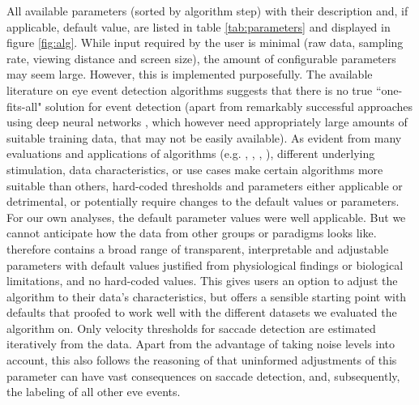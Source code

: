     All available parameters (sorted by algorithm step) with their description and, if applicable, default value, are
    listed in table \ref{tab:parameters} and displayed in figure \ref{fig:alg}. While input required by the user is
    minimal (raw data, sampling rate, viewing distance and screen size), the amount of configurable parameters may seem
    large. However, this is implemented purposefully.
    The available literature on eye event detection algorithms suggests that there is no true ``one-fits-all" solution
    for event detection (apart from remarkably successful approaches using deep neural networks \citep{Startsev2018},
    which however need appropriately large amounts of suitable training data, that may not be easily available). As
    evident from many evaluations and applications of algorithms (e.g. \cite{Andersson2017}, \cite{Larsson2013},
    \cite{Zemblys2018}, \cite{5523936}), different underlying stimulation, data characteristics, or use cases make
    certain algorithms more suitable than others, hard-coded thresholds and parameters either applicable or detrimental,
    or potentially require changes to the default values or parameters. For our own analyses, the default parameter
    values were well applicable. But we cannot anticipate how the data from other groups or paradigms looks like.
    \remodnav therefore contains a broad range of transparent, interpretable and adjustable parameters with default
    values justified from physiological findings or biological limitations, and no hard-coded values. This gives users
    an option to adjust the algorithm to their data's characteristics, but offers a sensible starting point with
    defaults that proofed to work well with the different datasets we evaluated the algorithm on. Only velocity
    thresholds for saccade detection are estimated iteratively from the data. Apart from the advantage of taking noise
    levels into account, this also follows the reasoning of \cite{Nystrom2010AnData} that uninformed adjustments of this
    parameter can have vast consequences on saccade detection, and, subsequently, the labeling of all other eve events.


